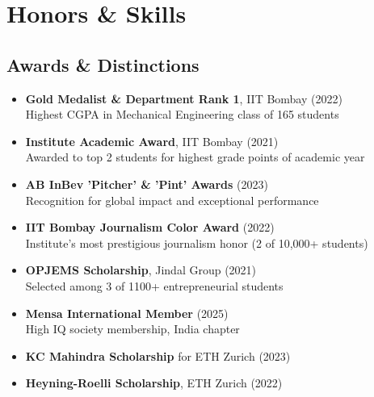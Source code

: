 \documentclass[letterpaper,10pt]{article}
\begin{document}
\section{Honors \& Skills}
\begin{multicols}{2}

\subsection*{Awards \& Distinctions}
\begin{itemize}[leftmargin=0.15in]
    \item \textbf{Gold Medalist \& Department Rank 1}, IIT Bombay (2022)\\
          Highest CGPA in Mechanical Engineering class of 165 students
    \item \textbf{Institute Academic Award}, IIT Bombay (2021)\\
          Awarded to top 2 students for highest grade points of academic year
    \item \textbf{AB InBev 'Pitcher' \& 'Pint' Awards} (2023)\\
          Recognition for global impact and exceptional performance
    \item \textbf{IIT Bombay Journalism Color Award} (2022)\\
          Institute's most prestigious journalism honor (2 of 10,000+ students)
    \item \textbf{OPJEMS Scholarship}, Jindal Group (2021)\\
          Selected among 3 of 1100+ entrepreneurial students
    \item \textbf{Mensa International Member} (2025)\\
          High IQ society membership, India chapter
    \item \textbf{KC Mahindra Scholarship} for ETH Zurich (2023)
    \item \textbf{Heyning-Roelli Scholarship}, ETH Zurich (2022)
\end{itemize}

\columnbreak


\end{multicols}
\end{document}
